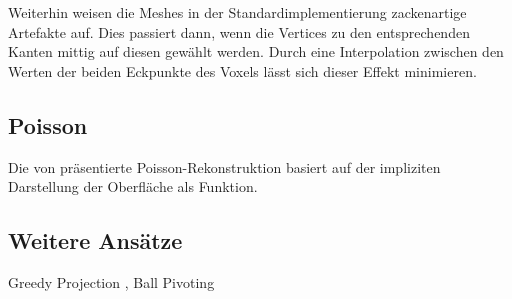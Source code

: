 Weiterhin weisen die Meshes in der Standardimplementierung zackenartige Artefakte auf.
Dies passiert dann, wenn die Vertices zu den entsprechenden Kanten mittig auf diesen gewählt werden.
Durch eine Interpolation zwischen den Werten der beiden Eckpunkte des Voxels lässt sich dieser Effekt minimieren.


\subsection{Poisson}
\label{subsec:poisson}

Die \citeyear{kazhdan2006poisson} von \citeauthor{kazhdan2006poisson} präsentierte Poisson-Rekonstruktion \cite{kazhdan2006poisson} basiert auf der impliziten Darstellung der Oberfläche als Funktion.



\subsection{Weitere Ansätze}
\label{subsec:triangulation-others}
Greedy Projection \cite{Marton09ICRA},
Ball Pivoting \cite{bernardini1999ball}
